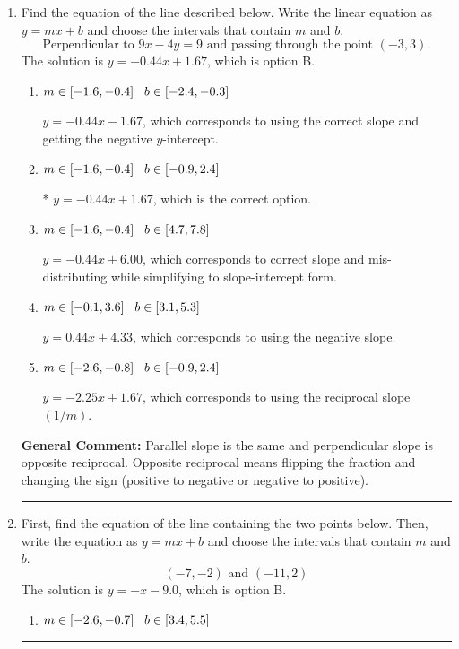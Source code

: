 \documentclass{extbook}[14pt]
\newcommand{\litem}[1]{\item #1

\rule{\textwidth}{0.4pt}}
\begin{document}
\begin{enumerate}\litem{
Find the equation of the line described below. Write the linear equation as $ y=mx+b $ and choose the intervals that contain $m$ and $b$.
\[ \text{Perpendicular to } 9 x - 4 y = 9 \text{ and passing through the point } (-3, 3). \]The solution is \( y = -0.44x + 1.67 \), which is option B.\begin{enumerate}[label=\Alph*.]
\item \( m \in [-1.6, -0.4] \hspace*{3mm} b \in [-2.4, -0.3] \)

 $y = -0.44x - 1.67$, which corresponds to using the correct slope and getting the negative $y$-intercept.
\item \( m \in [-1.6, -0.4] \hspace*{3mm} b \in [-0.9, 2.4] \)

* $y = -0.44x + 1.67$, which is the correct option.
\item \( m \in [-1.6, -0.4] \hspace*{3mm} b \in [4.7, 7.8] \)

 $y = -0.44x + 6.00$, which corresponds to correct slope and mis-distributing while simplifying to slope-intercept form.
\item \( m \in [-0.1, 3.6] \hspace*{3mm} b \in [3.1, 5.3] \)

 $y = 0.44x + 4.33$, which corresponds to using the negative slope.
\item \( m \in [-2.6, -0.8] \hspace*{3mm} b \in [-0.9, 2.4] \)

 $y = -2.25x + 1.67$, which corresponds to using the reciprocal slope $(1/m)$.
\end{enumerate}

\textbf{General Comment:} Parallel slope is the same and perpendicular slope is opposite reciprocal. Opposite reciprocal means flipping the fraction and changing the sign (positive to negative or negative to positive).
}
\litem{
First, find the equation of the line containing the two points below. Then, write the equation as $ y=mx+b $ and choose the intervals that contain $m$ and $b$.
\[ (-7, -2) \text{ and } (-11, 2) \]The solution is \( y = -x -9.0 \), which is option B.\begin{enumerate}[label=\Alph*.]
\item \( m \in [-2.6, -0.7] \hspace*{3mm} b \in [3.4, 5.5] \)


\end{enumerate}}
\end{enumerate}
\end{document}
